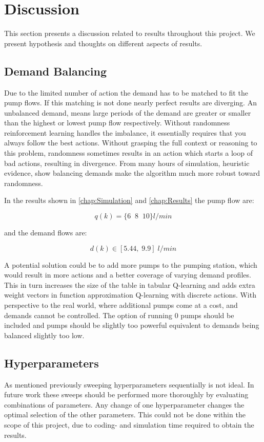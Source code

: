 \chapter{Discussion}\label{chap:Discussion}

This section presents a discussion related to results throughout this project. We present hypothesis and thoughts on different aspects of results. 

\section{Demand Balancing}

Due to the limited number of action the demand has to be matched to fit the pump flows. If this matching is not done nearly perfect results are diverging. An unbalanced demand, means large periods of the demand are greater or smaller than the highest or lowest pump flow respectively. Without randomness reinforcement learning handles the imbalance, it essentially requires that you always follow the best actions. Without grasping the full context or reasoning to this problem, randomness sometimes results in an action which starts a loop of bad actions, resulting in divergence. From many hours of simulation, heuristic evidence, show balancing demands make the algorithm much more robust toward randomness.

In the results shown in \cref{chap:Simulation} and \cref{chap:Results} the pump flow are:

\begin{equation*}
q(k)=\{6\;\; 8 \;\; 10\}l/min
\end{equation*}

and the demand flows are:

\begin{equation*}
	d(k)\in [5.44,\; 9.9] \; l/min
\end{equation*}


 A potential solution could be to add more pumps to the pumping station, which would result in more actions and a better coverage of varying demand profiles. This in turn increases the size of the table in tabular Q-learning and adds extra weight vectors in function approximation Q-learning with discrete actions. 
With perspective to the real world, where additional pumps come at a cost, and demands cannot be controlled. The option of running 0 pumps should be included and pumps should be slightly too powerful equivalent to demands being balanced slightly too low.

\section{Hyperparameters}
As mentioned previously sweeping hyperparameters sequentially is not ideal. In future work these sweeps should be performed more thoroughly by evaluating combinations of parameters. Any change of one hyperparameter changes the optimal selection of the other parameters. This could not be done within the scope of this project, due to coding- and simulation time required to obtain the results. 

